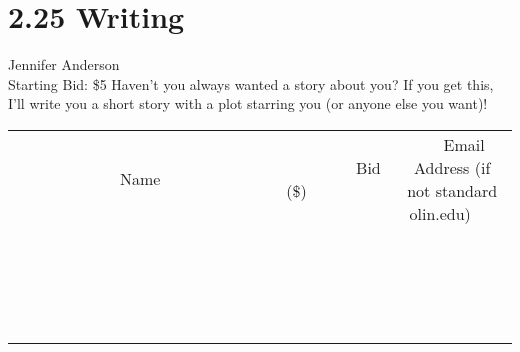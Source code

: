 \documentclass[11pt]{article}
\begin{document}
\section*{2.25 Writing}
Jennifer Anderson
\\
Starting Bid: \$5
\newline
Haven't you always wanted a story about you? If you get this, I'll write you a short story with a plot starring you (or anyone else you want)!
\\[3ex]
\begin{tabular}{c c c}
~~~~~~~~~~~~~Name~~~~~~~~~~~~~ & ~~~~~~~~~Bid (\$)~~~~~~~~~  & ~~~Email Address (if not standard olin.edu)~~~\\
 & & \\
\hline
 & & \\
\hline
 & & \\
\hline
 & & \\
\hline
 & & \\
\hline
 & & \\
\hline
 & & \\
\hline
 & & \\
\hline
 & & \\
\hline
 & & \\
\hline
 & & \\
\hline
 & & \\
\hline
 & & \\
\hline
 & & \\
\hline
 & & \\
\hline
 & & \\
\hline
 & & \\
\hline
 & & \\
\hline
 & & \\
\hline
\end{tabular}
\newpage
\end{document}
